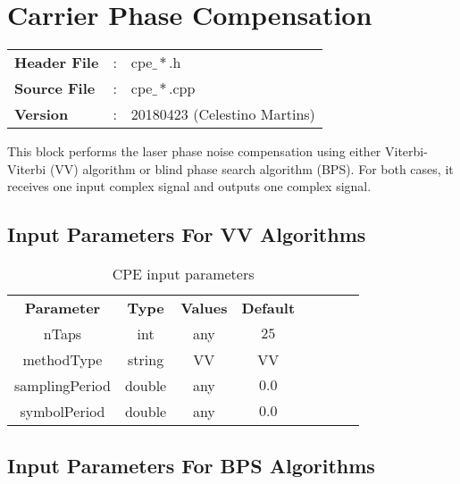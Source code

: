 \clearpage

\section{Carrier Phase Compensation}

\begin{tcolorbox}	
	\begin{tabular}{p{2.75cm} p{0.2cm} p{10.5cm}} 	
		\textbf{Header File}   &:& cpe$\_*$.h \\
		\textbf{Source File}   &:& cpe$\_*$.cpp \\
        \textbf{Version}       &:& 20180423 (Celestino Martins) \\
	\end{tabular}
\end{tcolorbox}

This block performs the laser phase noise compensation using either Viterbi-Viterbi (VV) algorithm or blind phase search algorithm (BPS). For both cases, it receives one input complex signal and outputs one complex signal.

\subsection*{Input Parameters For VV Algorithms}

\begin{table}[h]
	\centering
	\begin{tabular}{|c|c|c|c|cccc}
		\cline{1-4}
		\textbf{Parameter} & \textbf{Type} & \textbf{Values} &   \textbf{Default}& \\ \cline{1-4}
		nTaps              & int & any & $25$ \\ \cline{1-4}
        methodType         & string & VV & VV \\ \cline{1-4}
		samplingPeriod     & double & any & $0.0$ \\ \cline{1-4}	
        symbolPeriod       & double & any & $0.0$ \\ \cline{1-4}	
	\end{tabular}
	\caption{CPE input parameters}
	\label{table:cpe_in_par_vv}
\end{table}


\subsection*{Input Parameters For BPS Algorithms}

